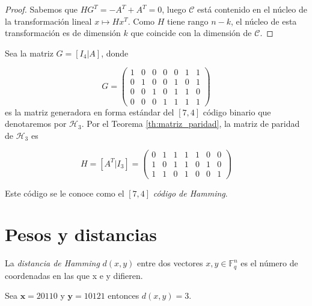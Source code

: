\begin{proof}
Sabemos que $HG^T = -A^T + A^T = 0$, luego $\mathcal{C}$ está contenido en el núcleo de la transformación lineal $x \mapsto Hx^T$. Como $H$ tiene rango $n-k$, el núcleo de esta transformación es de dimensión $k$ que coincide con la dimensión de $\mathcal{C}$.
\end{proof}

\begin{exampleth}
 \label{ex:matriz_generadora}
Sea la matriz $G = \left[I_4 | A\right]$, donde

\[
G = \left( \begin{array}{cccc|ccc}
	1 & 0 & 0 & 0 & 0 & 1 & 1 \\
	0 & 1 & 0 & 0 & 1 & 0 & 1 \\
	0 & 0 & 1 & 0 & 1 & 1 & 0 \\
	0 & 0 & 0 & 1 & 1 & 1 & 1 
			\end{array} 
	\right)
\]
es la matriz generadora en forma estándar del $\left[7,4\right]$ código binario que denotaremos por $\mathcal{H}_3$.
Por el Teorema \ref{th:matriz_paridad}, la matriz de paridad de $\mathcal{H}_3$ es

\[
H =  \left[A^T | I_3\right] = \left( \begin{array}{cccc|ccc}
	0 & 1 & 1 & 1 & 1 & 0 & 0 \\
	1 & 0 & 1 & 1 & 0 & 1 & 0 \\
	1 & 1 & 0 & 1 & 0 & 0 & 1 

			\end{array} 
	\right)
\]

Este código se le conoce como el $\left[7,4\right]$ \emph{código de Hamming}.
\end{exampleth}

\section{Pesos y distancias}
\begin{definition}
La \textit{distancia de Hamming} $d(x,y)$ entre dos vectores $x,y \in \mathbb{F}_q^n$ es el número de coordenadas en las que x e y difieren. 
\end{definition}

\begin{exampleth}
	Sea $\mathbf{x}=20110$ y $\mathbf{y}=10121$ entonces $d(x,y)=3$.
\end{exampleth}

